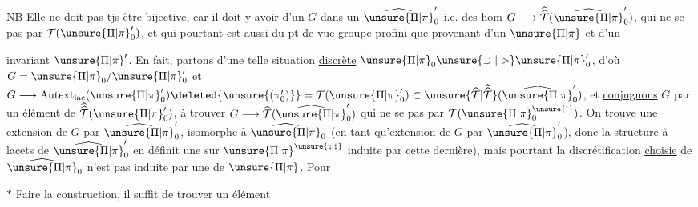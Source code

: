 \uline{NB} Elle ne doit pas tjs être bijective,
car il doit y avoir    d'un
\(G\) dans un \(\widehat{\unsure{\Pi|\pi}}'_0\) i.e. des hom
\(G\longrightarrow\widehat{\widehat{\mathcal T}}(\widehat{\unsure{\Pi|\pi}}'_0)\), qui ne se  pas
par \(\mathcal T(\unsure{\Pi|\pi}'_0)\), et qui pourtant est aussi
 du pt de vue groupe profini que
 provenant d'un \(\unsure{\Pi|\pi}\) et d'un 


invariant $\unsure{\Pi|\pi}'$. En fait, partons d'une telle situation \uline{discrète} $\unsure{\Pi|\pi}_0 \unsure{\supset|>} \unsure{\Pi|\pi}'_0$, d'où $G=\unsure{\Pi|\pi}_0/\unsure{\Pi|\pi}'_0$ et $G\longrightarrow \operatorname{Autext}_{\mathrm{lac}}(\unsure{\Pi|\pi}'_0)\deleted{\unsure{(\pi'_0)}}=\mathcal T(\unsure{\Pi|\pi}'_0)\subset\unsure{\widehat{\mathcal T}|\widehat{\widehat{\mathcal T}}}(\widehat{\unsure{\Pi|\pi}}'_0)$, et \uline{conjuguons} $G$ par un élément \inserted{$\gamma$} de $\widehat{\widehat{\mathcal T}}(\unsure{\Pi|\pi}'_0)$,  à trouver $G\longrightarrow\widehat{\mathcal T}(\widehat{\unsure{\Pi|\pi}}'_0)$ qui ne se  pas par $\mathcal T(\unsure{\Pi|\pi}^{\unsure{'}}_0)$. On trouve une extension \inserted{$\unsure{\widehat{\unsure{\Pi|\pi}}|\unsure{\Pi|\pi}}^{\unsure{\natural|\sharp}}$} de $G$ par $\widehat{\unsure{\Pi|\pi}}'_0$, \uline{isomorphe} à $\widehat{\unsure{\Pi|\pi}}_0$ (en tant qu'extension de $G$ par $\widehat{\unsure{\Pi|\pi}}'_0$), donc la structure à lacets de $\widehat{\unsure{\Pi|\pi}}'_0$ en définit une sur $\unsure{\Pi|\pi}^{\unsure{\natural|\sharp}}$   induite par cette dernière), mais pourtant la discrétification \uline{choisie}  de $\widehat{\unsure{\Pi|\pi}}_0$ n'est pas induite par une de $\unsure{\Pi|\pi}$. Pour

$\ast$ Faire la construction, il suffit de trouver un élément  

